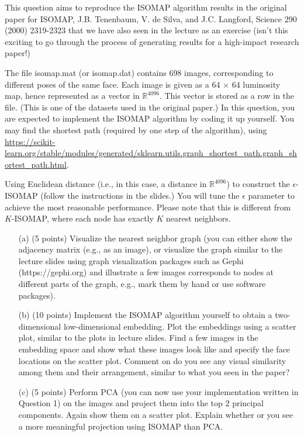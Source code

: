 \documentclass[twoside,10pt]{article}
\begin{document}
This question aims to reproduce the ISOMAP algorithm results in the original paper for ISOMAP, J.B. Tenenbaum, V. de Silva, and J.C. Langford, Science 290 (2000) 2319-2323 that we have also seen in the lecture as an exercise (isn't this exciting to go through the process of generating results for a high-impact research paper!) 


The file \textsf{isomap.mat} (or \textsf{isomap.dat}) contains 698 images, corresponding to different poses of the same face. Each image is given as a 64 $\times$ 64 luminosity map, hence represented as a vector in $\mathbb R^{4096}$. This vector is stored as a row in the file. (This is one of the datasets used in the original paper.) In this question, you are expected to implement the ISOMAP algorithm by coding it up yourself. You may find the shortest path (required by one step of the algorithm), using \url{https://scikit-learn.org/stable/modules/generated/sklearn.utils.graph\_shortest\_path.graph\_shortest_path.html}. 

Using Euclidean distance (i.e., in this case, a distance in $\mathbb R^{4096}$) to construct the $\epsilon$-ISOMAP (follow the instructions in the slides.) You will tune the $\epsilon$ parameter to achieve the most reasonable performance. Please note that this is different from $K$-ISOMAP, where each node has exactly $K$ nearest neighbors.

\begin{enumerate} 

\item[(a)] (5 points) Visualize the nearest neighbor graph (you can either show the adjacency matrix (e.g., as an image), or visualize the graph similar to the lecture slides using graph visualization packages such as Gephi (\textsf{https://gephi.org}) and illustrate a few images corresponds to nodes at different parts of the graph, e.g., mark them by hand or use software packages).
 
\item[(b)] (10 points) Implement the ISOMAP algorithm yourself to obtain a two-dimensional low-dimensional embedding. Plot the embeddings using a scatter plot, similar to the plots in lecture slides. Find a few images in the embedding space and show what these images look like and specify the face locations on the scatter plot. Comment on do you see any visual similarity among them and their arrangement, similar to what you seen in the paper?

\item[(c)] (5 points) Perform PCA (you can now use your implementation written in Question 1) on the images and project them into the top 2 principal components. Again show them on a scatter plot. Explain whether or you see a more meaningful projection using ISOMAP than PCA. 

\end{enumerate}
\end{document}
